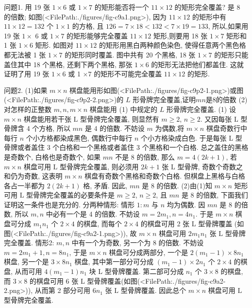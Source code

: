 
问题1. 用 19 张 $1 \times 6$ 或 $1 \times 7$ 的矩形能否将一个 $11 \times 12$ 的矩形完全覆盖? 是 8 的倍数;
如图(<FilePath:./figures/fig-c9a1.png>), 因为 $11 \times 12$ 的矩形中有 $11 \times 12=132$ 个 $1 \times 1$ 的方格, 且 $126=7 \times 18<132<7 \times 19=133$, 所以,如果用 19 张 $1 \times$ 6 或 $1 \times 7$ 的矩形能够完全覆盖 $11 \times 12$ 矩形,则要用 18 张 $1 \times 7$ 矩形和 1 张 $1 \times 6$ 矩形.
如图对 $11 \times 12$ 的矩形用黑白两种颜色染色, 使得任意两个黑色格都无法被 1 张 $1 \times 7$ 的矩形同时覆盖.
图中共有 20 个黑格, 18 张 $1 \times 7$ 的矩形只能盖住其中 18 个黑格, 还剩下两个黑格, 那张 $1 \times 6$ 的矩形无法把他们都盖住.
这就证明了用 19 张 $1 \times 6$ 或 1 $\times 7$ 的矩形不可能完全覆盖 $11 \times 12$ 的矩形.



问题2. (1)如果 $m\times n$ 棋盘能用形如图(<FilePath:./figures/fig-c9p2-1.png>)或图(<FilePath:./figures/fig-c9p2-2.png>)的 $L$ 形骨牌完全覆盖,证明$m n$是8的倍数
(2) 对怎样的正整数 $m, n, m \times n$ 棋盘能用 (1) 中规定的 $L$ 形骨牌完全覆盖.
(1) 设 $m \times n$ 棋盘能用若干张 $\mathrm{L}$ 型骨牌完全覆盖, 则显然有 $m \geqslant 2$, $n \geqslant 2$. 又因每张 $\mathrm{L}$ 型骨牌含 4 个方格, 所以 $m n$ 是 4 的倍数.
不妨设 $m$ 为偶数,将 $m \times n$ 棋盘奇数行中每行 $n$ 个小方格都染成黑色, 偶数行中每行 $n$ 个小方格染成白色.
于是每张 L 型骨牌或者盖住 3 个白格和一个黑格或者盖住 3 个黑格和一个白格.
总之盖住的黑格是奇数个, 白格也是奇数个, 如果 $m n$ 不是 8 的倍数, 那么 $m=4(2 k+1)$, 若 $m \times n$ 棋盘可用 $\mathrm{L}$ 型骨牌完全覆盖, 则必须用 $2 k+1$ 张 $\mathrm{L}$ 型骨牌, 奇数个奇数之和仍为奇数, 这表明 $m \times n$ 棋盘有奇数个黑格和奇数个白格.
但棋盘上黑格与白格各占一半都为 $2(2 k+1)$ 格, 矛盾.
因此, $m n$ 是 8 的倍数.
(2)由(1)知 $m \times n$ 矩形可用 $\mathrm{L}$ 型骨牌完全覆盖的必要条件是 $m \geqslant 2$, $n \geqslant 2$, 且 $m n$ 是 8 的倍数, 下面我们证明这一条件也是充分的.
分两种情形: 情形 $1: m$ 与 $n$ 均为偶数.
因 $m n$ 是 8 的倍数, 所以 $m, n$ 中必有一个是 4 的倍数.
不妨设 $m=2 m_1, n=4 n_1$. 于是 $m \times n$ 棋盘可分成 $m_1 n_1$ 个 $2 \times 4$ 的棋盘, 而每个 $2 \times 4$ 的棋盘可用 2 张 L 型骨牌覆盖 (如图(<FilePath:./figures/fig-c9a2-1.png>)), 故 $m \times n$ 棋盘可用 $2 m_1 n_1$ 张 $\mathrm{L}$ 型骨牌完全覆盖.
情形2: $m, n$ 中有一个为奇数, 另一个为 8 的倍数.
不妨设 $m=2 m_1+1, n=8 n_1$, 于是 $m \times n$ 棋盘可分成两部分, 一个是 $2\left(m_1-1\right) \times 8 n_1$ 棋盘, 另一个是 $3 \times 8 n_1$ 棋盘, 其中第一部分可分成 $\left(m_1-1\right) \times 2 n_1$ 个 $2 \times 4$ 的棋盘, 从而可用 $4\left(m_1-1\right) n_1$ 块 L 型骨牌覆盖.
第二部可分成 $n_1$ 个 $3 \times 8$ 的棋盘, 而 $3 \times 8$ 的棋盘可用 6 张 L 型骨牌覆盖(如图(<FilePath:./figures/fig-c9a2-2.png>)), 从而第 2 部分可用 $6 n_1$ 张 $\mathrm{L}$ 型骨牌覆盖.
因此总个 $m \times n$ 棋盘可用 $\mathrm{L}$ 型骨牌完全覆盖.



